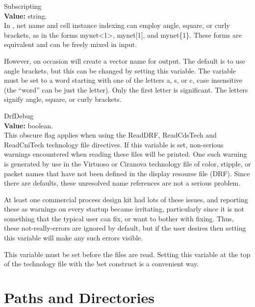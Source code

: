 \begin{description}
\item{\et Subscripting}\\
{\bf Value:} string.\\
In {\Xic}, net name and cell instance indexing can employ angle,
square, or curly brackets, as in the forms {\vt mynet<1>}, {\vt
mynet[1]}, and {\vt mynet\{1\}}.  These forms are equivalent and can
be freely mixed in {\Xic} input.

However, on occasion {\Xic} will create a vector name for output.  The
default is to use angle brackets, but this can be changed by setting
this variable.  The variable must be set to a word starting with one
of the letters {\vt a}, {\vt s}, or {\vt c}, case insensitive (the
``word'' can be just the letter).  Only the first letter is
significant.  The letters signify angle, square, or curly brackets.

\item{\et DrfDebug}\\
{\bf Value:} boolean.\\
This obscure flag applies when using the {\vt ReadDRF}, {\vt
ReadCdsTech} and {\vt ReadCniTech} technology file directives.  If
this variable is set, non-serious warnings encountered when reading
these files will be printed.  One such warning is generated by use in
the Virtuoso or Ciranova technology file of color, stipple, or packet
names that have not been defined in the display resourse file (DRF). 
Since there are defaults, these unresolved name references are not a
serious problem.

At least one commercial process design kit had lots of these issues,
and reporting these as warnings on every {\Xic} startup became
irritating, particularly since it is not something that the typical
user can fix, or want to bother with fixing.  Thus, these
not-really-errors are ignored by default, but if the user desires then
setting this variable will make any such errors visible.

This variable must be set before the files are read.  Setting this
variable at the top of the {\Xic} technology file with the {\vt !set}
construct is a convenient way.
\end{description}


\section{Paths and Directories}
\label{pathvars}

